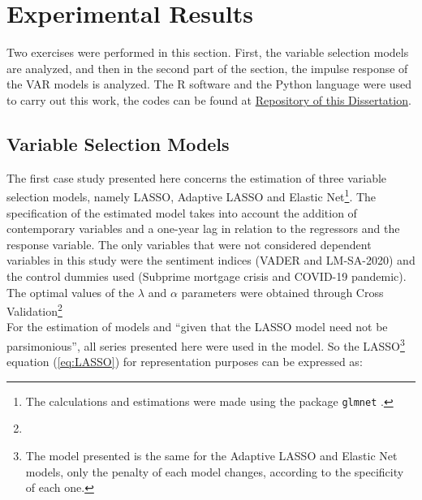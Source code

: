 
\section{Experimental Results} \label{sec:expresults}

Two exercises were performed in this section. First, the variable selection models are analyzed, and then in the second part of the section, the impulse response of the VAR models is analyzed. The R software and the Python language \cite[]{van1995python} were used to carry out this work, the codes can be found at \href{https://github.com/gustavovital/Dissertation}{Repository of this Dissertation}.\\

\subsection{Variable Selection Models}

The first case study presented here concerns the estimation of three variable selection models, namely LASSO, Adaptive LASSO and Elastic Net\footnote{The calculations and estimations were made using the package \texttt{glmnet} \cite[] {glmnet2011noah}.}. The specification of the estimated model takes into account the addition of contemporary variables and a one-year lag in relation to the regressors and the response variable. The only variables that were not considered dependent variables in this study were the sentiment indices (VADER and LM-SA-2020) and the control dummies used (Subprime mortgage crisis and COVID-19 pandemic). The optimal values of the $\lambda$ and $\alpha$ parameters were obtained through Cross Validation\footnote{}\\


For the estimation of models and ``given that the LASSO model need not be parsimonious''\cite[p. 25]{shapiro2020measuring}, all series presented here were used in the model. So the LASSO\footnote{The model presented is the same for the Adaptive LASSO and Elastic Net models, only the penalty of each model changes, according to the specificity of each one.} equation (\ref{eq:LASSO}) for representation purposes can be expressed as:

